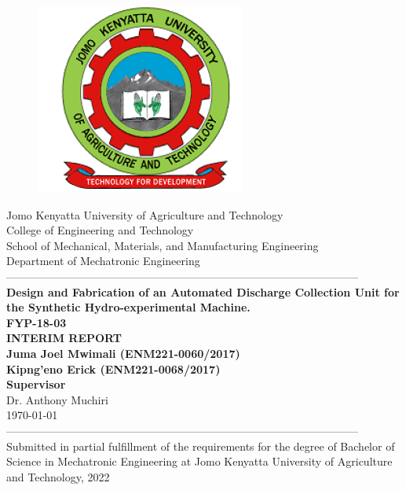 \documentclass[12pt,fleqn]{article}
\begin{document}
\begin{titlepage}
  \begin{center}
      \vspace*{-4.0cm}
    \begin{figure}[!h]
\centering
\includegraphics[width=0.3\linewidth]{Figures/JKUAT_logo}
\label{fig:jomologo}
\end{figure}
   \large{Jomo Kenyatta University of Agriculture and Technology}\\
    \large{College of Engineering and Technology}\\
    \large{School of Mechanical, Materials, and Manufacturing Engineering}\\
   \large{Department of Mechatronic Engineering}\\
    ------------------------------------------------------------------------------------------------\\[0.1cm]
    \LARGE{\textbf{Design and Fabrication of an Automated Discharge Collection Unit for the Synthetic Hydro-experimental Machine.}}\\[0.1cm]
    \LARGE{\textbf{FYP-18-03}}\\[0.4cm]
    \LARGE{\textbf{INTERIM REPORT}}\\[0.4cm]
    \large{\textbf{Juma Joel Mwimali (ENM221-0060/2017)}}\\[0.2cm]
    \large{\textbf{Kipng'eno Erick  (ENM221-0068/2017)}}\\[0.2cm]
     \large{\textbf{Supervisor}}\\
	\large{Dr. Anthony Muchiri}\\
    \large{\small{\monthyeardate\today}}\\
        ------------------------------------------------------------------------------------------------\\
    \small{Submitted in partial fulfillment of the requirements for the degree of Bachelor of Science in Mechatronic Engineering at Jomo Kenyatta University of Agriculture and Technology, 2022}\\
  \end{center}
\end{titlepage}
\end{document}
